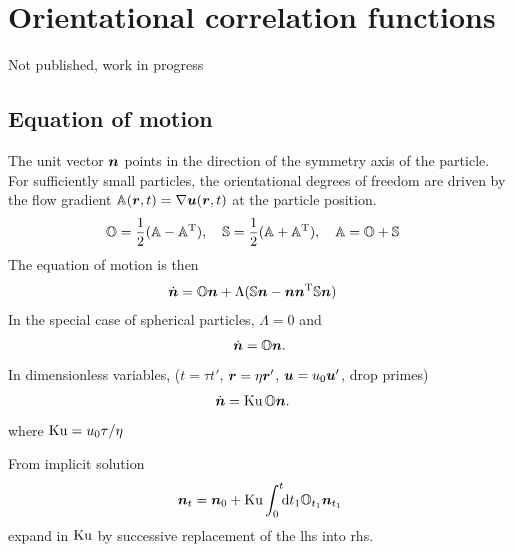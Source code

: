 \documentclass[thesis.tex]{subfiles}
\begin{document}
\chapter{Orientational correlation functions}

Not published, work in progress

\section{Equation of motion}
The unit vector $\mbox{\boldmath$n$}$ points in the direction of the symmetry axis of the particle. For sufficiently small particles, the orientational degrees of freedom are driven by the flow gradient $\mathbb{A}(\mbox{\boldmath$r$}, t) = \nabla \mbox{\boldmath$u$}(\mbox{\boldmath$r$}, t)$ at the particle position. 
\begin{align*}
	&\mathbb{O} = \frac{1}{2}(\mathbb{A} - \mathbb{A}^{\mathrm T}),\quad
	\mathbb{S} = \frac{1}{2}(\mathbb{A} + \mathbb{A}^{\mathrm T}),\quad
	\mathbb{A} = \mathbb{O} + \mathbb{S}
\end{align*}
The equation of motion is then
\begin{align*}
	\dot{\mbox{\boldmath$n$}} &= \mathbb{O} \mbox{\boldmath$n$} + \Lambda (\mathbb{S} \mbox{\boldmath$n$} - \mbox{\boldmath$n$} \mbox{\boldmath$n$}^{\mathrm T}\mathbb{S} \mbox{\boldmath$n$})
\end{align*}
In the special case of spherical particles, $\Lambda=0$ and
\begin{align*}
	\dot{\mbox{\boldmath$n$}} &= \mathbb{O} \mbox{\boldmath$n$}. \\
\end{align*}
In dimensionless variables, ($t=\tau t'$, $\mbox{\boldmath$r$} = \eta \mbox{\boldmath$r$}'$, $\mbox{\boldmath$u$} = u_0 \mbox{\boldmath$u$}'$, drop primes)
\begin{align*}
	\dot{\mbox{\boldmath$n$}} &= \mbox{Ku}\,\mathbb{O} \mbox{\boldmath$n$}.
\end{align*}
where $\mbox{Ku} = u_0 \tau / \eta$

From implicit solution
\begin{align*}
	\mbox{\boldmath$n$}_t &= \mbox{\boldmath$n$}_0 + \mbox{Ku}\int_0^t \!\!\mathrm{d} t_1 \mathbb{O}_{t_1} \mbox{\boldmath$n$}_{t_1} \\
\end{align*}
expand in $\mbox{Ku}$ by successive replacement of the lhs into rhs.
\end{document}
